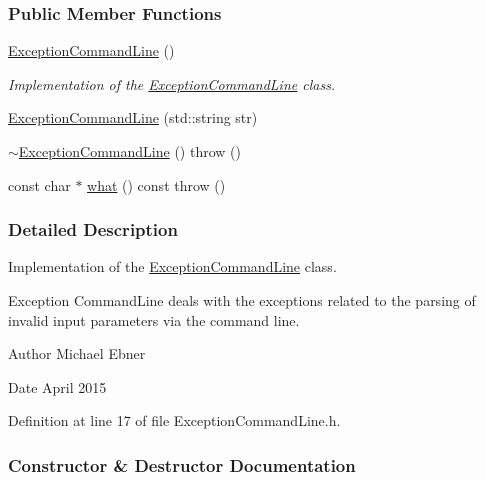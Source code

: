 \subsubsection*{Public Member Functions}
\begin{DoxyCompactItemize}
\item 
\hyperlink{a00026_aa589665fc8a1c5ae711ec458ca4614f9}{Exception\+Command\+Line} ()
\begin{DoxyCompactList}\small\item\em Implementation of the \hyperlink{a00026}{Exception\+Command\+Line} class. \end{DoxyCompactList}\item 
\hyperlink{a00026_a524035e194c921748f0be8601946a0aa}{Exception\+Command\+Line} (std\+::string str)
\item 
\hyperlink{a00026_a78081ea750b45bc12a0f5ba6fb09323a}{$\sim$\+Exception\+Command\+Line} ()  throw ()
\item 
const char $\ast$ \hyperlink{a00026_ad9852e72f2da8de15f9e438b8a23d42a}{what} () const   throw ()
\end{DoxyCompactItemize}


\subsubsection{Detailed Description}
Implementation of the \hyperlink{a00026}{Exception\+Command\+Line} class. 

Exception Command\+Line deals with the exceptions related to the parsing of invalid input parameters via the command line.

\begin{DoxyAuthor}{Author}
Michael Ebner 
\end{DoxyAuthor}
\begin{DoxyDate}{Date}
April 2015 
\end{DoxyDate}


Definition at line 17 of file Exception\+Command\+Line.\+h.



\subsubsection{Constructor \& Destructor Documentation}
\hypertarget{a00026_aa589665fc8a1c5ae711ec458ca4614f9}{}
